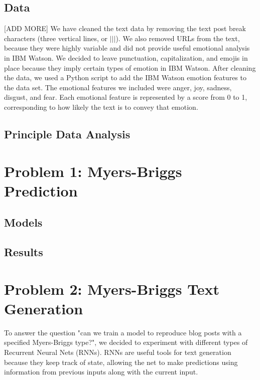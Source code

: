 \documentclass{article}
\begin{document}
\subsection{Data}
[ADD MORE] We have cleaned the text data by removing the text post break characters (three vertical lines, or $|||$). We also removed URLs from the text, because they were highly variable and did not provide useful emotional analysis in IBM Watson. We decided to leave punctuation, capitalization, and emojis in place because they imply certain types of emotion in IBM Watson. After cleaning the data, we used a Python script to add the IBM Watson emotion features to the data set. The emotional features we included were anger, joy, sadness, disgust, and fear. Each emotional feature is represented by a score from 0 to 1, corresponding to how likely the text is to convey that emotion. 

\subsection{Principle Data Analysis}

\section{Problem 1: Myers-Briggs Prediction}

\subsection{Models}

\subsection{Results}

\section{Problem 2: Myers-Briggs Text Generation}
To answer the question "can we train a model to reproduce blog posts with a specified Myers-Briggs type?", we decided to experiment with different types of Recurrent Neural Nets (RNNs). RNNs are useful tools for text generation because they keep track of state, allowing the net to make predictions using information from previous inputs along with the current input.
\end{document}
